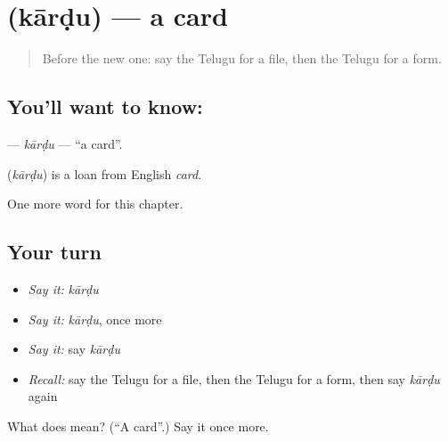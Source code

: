 \section[\texorpdfstring{\te{కార్డు} (kārḍu)}{కార్డు (kārḍu)}]{ (kārḍu) — a card}

\label{lesson:TE-C226-kardu}



\begin{quote}
Before the new one: say the Telugu for a file, then the Telugu for a form.
\end{quote}

\subsection*{You'll want to know: }
\textbf{} — \emph{kārḍu} — \textquotedblleft{}a card\textquotedblright{}.

\begin{cousinweb}
\textbf{} (\emph{kārḍu}) is a loan from English \emph{card}.
\end{cousinweb}

\begin{grammarlens}[title={What you've built}]
One more word for this chapter.
\end{grammarlens}

\subsection*{Your turn}
\begin{itemize}
\raggedright
  \item \emph{Say it:} \emph{kārḍu}
  \item \emph{Say it:} \emph{kārḍu}, once more
  \item \emph{Say it:} say \emph{kārḍu}
  \item \emph{Recall:} say the Telugu for a file, then the Telugu for a form, then say \emph{kārḍu} again
\end{itemize}

\begin{tcolorbox}[breakable,colback=teal!4,colframe=teal!35!black,title={Before you move on}]
What does  mean? (\textquotedblleft{}A card\textquotedblright{}.) Say it once more.
\end{tcolorbox}

